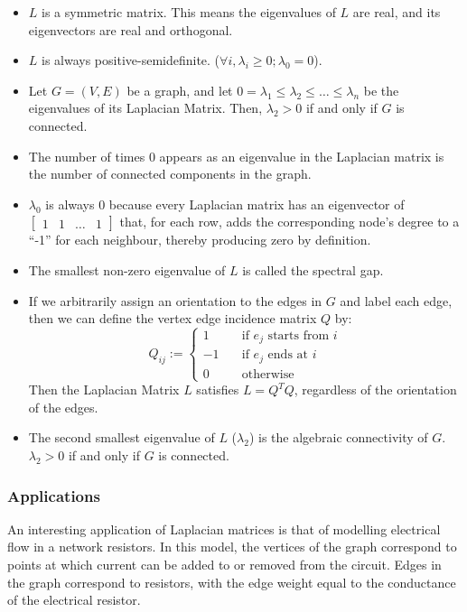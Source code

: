 \begin{itemize}
    \item $L$ is a symmetric matrix. This means the eigenvalues of $L$ are real,
        and its eigenvectors are real and orthogonal.
    \item $L$ is always positive-semidefinite.
        ($\forall i,\lambda_i\geq 0;\lambda_0 = 0$).
    \item Let $G=(V,E)$ be a graph, and let
        $0=\lambda_1\leq\lambda_2\leq\ldots\leq\lambda_n$ be the eigenvalues of
        its Laplacian Matrix. Then, $\lambda_2>0$ if and only if $G$ is
        connected.
    \item The number of times 0 appears as an eigenvalue in the Laplacian matrix
        is the number of connected components in the graph.
    \item $\lambda_0$ is always 0 because every Laplacian matrix has an
        eigenvector of $\begin{bmatrix} 1 & 1 & \ldots & 1 \end{bmatrix}$ that,
        for each row, adds the corresponding node's degree to a ``-1'' for each
        neighbour, thereby producing zero by definition.
    \item The smallest non-zero eigenvalue of $L$ is called the spectral gap.
    \item If we arbitrarily assign an orientation to the edges in $G$ and label
        each edge, then we can define the vertex edge incidence matrix $Q$ by:
        \begin{equation}
            Q_{ij} :=
                \left\{
                    \begin{array}{ll}
                        1 &     \quad \text{if $e_j$ starts from $i$}\\
                        -1 &    \quad \text{if $e_j$ ends at $i$}\\
                        0 &     \quad \text{otherwise}
                    \end{array}
                \right.
        \end{equation}
        Then the Laplacian Matrix $L$ satisfies $L = Q^TQ$, regardless of the
        orientation of the edges.
    \item The second smallest eigenvalue of $L$ ($\lambda_2$) is the algebraic
    connectivity of $G$. $\lambda_2>0$ if and only if $G$ is connected.
\end{itemize}

\subsubsection{Applications}
\label{laplacianMatrices:applications}
An interesting application of Laplacian matrices is that of modelling electrical
flow in a network resistors. In this model, the vertices of the graph correspond
to points at which current can be added to or removed from the circuit. Edges in
the graph correspond to resistors, with the edge weight equal to the conductance
of the electrical resistor.

